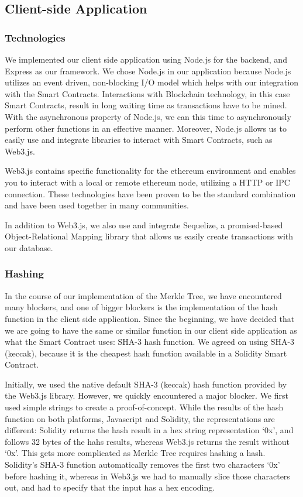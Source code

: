 \subsection{Client-side Application}
\label{subsec:approach-implementation-client}

\subsubsection*{Technologies}

We implemented our client side application using Node.js for the backend, and Express as our framework. We chose Node.js in our application because Node.js utilizes an event driven, non-blocking I/O model which helps with our integration with the Smart Contracts. Interactions with Blockchain technology, in this case Smart Contracts, result in long waiting time as transactions have to be mined. With the asynchronous property of Node.js, we can this time to asynchronously perform other functions in an effective manner. Moreover, Node.js allows us to easily use and integrate libraries to interact with Smart Contracts, such as Web3.js.

Web3.js contains specific functionality for the ethereum environment and enables you to interact with a local or remote ethereum node, utilizing a HTTP or IPC connection. These technologies have been proven to be the standard combination and have been used together in many communities. 

In addition to Web3.js, we also use and integrate Sequelize, a promised-based Object-Relational Mapping library that allows us easily create transactions with our database.

\subsubsection*{Hashing}

In the course of our implementation of the Merkle Tree, we have encountered many blockers, and one of bigger blockers is the implementation of the hash function in the client side application. Since the beginning, we have decided that we are going to have the same or similar function in our client side application as what the Smart Contract uses: SHA-3 hash function. We agreed on using SHA-3 (keccak), because it is the cheapest hash function available in a Solidity Smart Contract. 

Initially, we used the native default SHA-3 (keccak) hash function provided by the Web3.js library. However, we quickly encountered a major blocker. We first used simple strings to create a proof-of-concept. While the results of the hash function on both platforms, Javascript and Solidity, the representations are different: Solidity returns the hash result in a hex string representation ‘0x’, and follows 32 bytes of the hahs results, whereas Web3.js returns the result without ‘0x’. This gets more complicated as Merkle Tree requires hashing a hash. Solidity’s SHA-3 function automatically removes the first two characters ‘0x’ before hashing it, whereas in Web3.js we had to manually slice those characters out, and had to specify that the input has a hex encoding. 

